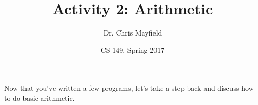 \documentclass[12pt]{article}
\title{Activity 2: Arithmetic}
\author{Dr. Chris Mayfield}
\date{CS 149, Spring 2017}
\begin{document}
\maketitle

Now that you've written a few programs, let's take a step back and discuss how to do basic arithmetic.




\end{document}
